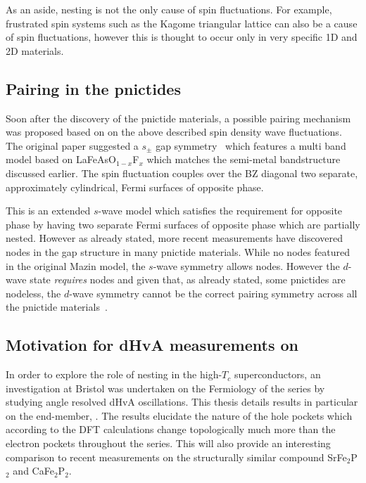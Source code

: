 As an aside, nesting is not the only cause of spin fluctuations. For example, frustrated spin systems such as the Kagome triangular lattice can also be a cause of spin fluctuations, however this is thought to occur only in very specific 1D and 2D materials.

\subsection{Pairing in the pnictides}

Soon after the discovery of the pnictide materials, a possible pairing mechanism was proposed based on on the above described spin density wave fluctuations. The original paper suggested a $s_{\pm}$ gap symmetry~\cite{Mazin2008} which features a multi band model based on LaFeAsO$_{1-x}$F$_x$ which matches the semi-metal bandstructure discussed earlier. The spin fluctuation couples over the \ac{BZ} diagonal two separate, approximately cylindrical, Fermi surfaces of opposite phase. 

This is an extended $s$-wave model which satisfies the requirement for opposite phase by having two separate Fermi surfaces of opposite phase which are partially nested. However as already stated, more recent measurements have discovered nodes in the gap structure in many pnictide materials. While no nodes featured in the original Mazin model, the $s$-wave symmetry allows nodes. However the $d$-wave state \emph{requires} nodes and given that, as already stated, some pnictides are nodeless, the $d$-wave symmetry cannot be the correct pairing symmetry across all the pnictide materials~\cite{Mazin2010}.


\subsection{Motivation for \ac{dHvA} measurements on \BaFeP{}}
    \label{Sec:Intro:MotivationPnictide}

In order to explore the role of nesting in the high-$T_c$ superconductors, an investigation at Bristol was undertaken on the Fermiology of the \BaFeAsP{} series by studying angle resolved \ac{dHvA} oscillations. This thesis details results in particular on the end-member, \BaFeP. The results elucidate the nature of the hole pockets which according to the \ac{DFT} calculations change topologically much more than the electron pockets throughout the series. This will also provide an interesting comparison to recent measurements on the structurally similar compound SrFe$_2$P$_2$ and CaFe$_2$P$_2$.

